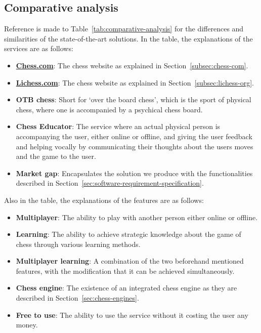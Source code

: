 \subsection{Comparative analysis}\label{subsec:comparative-analysis}

Reference is made to Table~\ref{tab:comparative-analysis} for the differences and similarities of the state-of-the-art
solutions.
In the table, the explanations of the services are as follows:

\begin{itemize}
    \item \textbf{\url{Chess.com}}: The chess website as explained in Section~\ref{subsec:chess-com}.
    \item \textbf{\url{Lichess.com}}: The chess website as explained in Section~\ref{subsec:lichess-org}.
    \item \textbf{OTB chess}: Short for `over the board chess',
    which is the sport of physical chess, where one is accompanied by a psychical chess board.
    \item \textbf{Chess Educator}: The service where an actual physical person is accompanying the user, either online
    or offline, and giving the user feedback and helping vocally by communicating their thoughts about the users moves
    and the game to the user.
    \item \textbf{Market gap}: Encapsulates the solution we produce with the functionalities described in
    Section~\ref{sec:software-requirement-specification}.
\end{itemize}

Also in the table, the explanations of the features are as follows:

\begin{itemize}
    \item \textbf{Multiplayer}: The ability to play with another person either online or offline.
    \item \textbf{Learning}: The ability to achieve strategic knowledge about the game of chess through various learning
    methods.
    \item \textbf{Multiplayer learning}: A combination of the two beforehand mentioned features, with the modification
    that it can be achieved simultaneously.
    \item \textbf{Chess engine}: The existence of an integrated chess engine as they are described in
    Section~\ref{sec:chess-engines}.
    \item \textbf{Free to use}: The ability to use the service without it costing the user any money.
\end{itemize}

